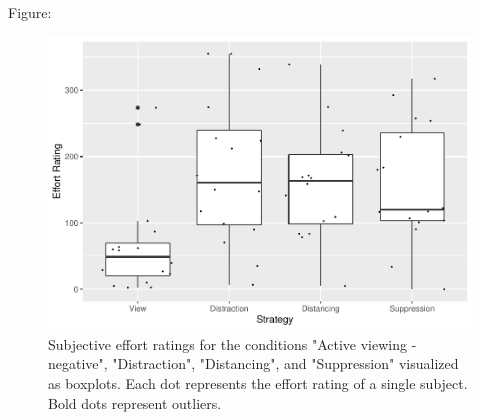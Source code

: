 \documentclass[
  english,
  man,floatsintext]{apa6}
\begin{document}
Figure:

\begin{figure}[H]
\includegraphics[width=0.75\linewidth]{Manuscript_ERED_Stage1_files/figure-latex/FigSubjEffortPilot-1} \caption{Subjective effort ratings for the conditions "Active viewing - negative", "Distraction", "Distancing", and "Suppression" visualized as boxplots. Each dot represents the effort rating of a single subject. Bold dots represent outliers.}\label{fig:FigSubjEffortPilot}
\end{figure}
\end{document}
